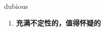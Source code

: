 
\begin{frame}
{\huge dubious}
\begin{center}
\begin{enumerate}\Large
  \item \textbf{充满不定性的，值得怀疑的}
\end{enumerate}
\end{center}
\end{frame}
